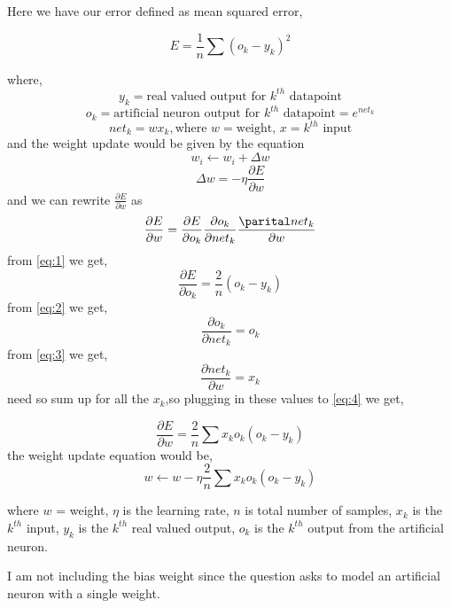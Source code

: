 \documentclass{article}
\begin{document}
Here we have our error defined as mean squared error,

\begin{equation}
\label{eq:1}
    E = \frac{1}{n}\sum (o_k - y_k)^2
\end{equation}

where,
\begin{displaymath}
    y_k = \mbox{real valued output for }k^{th} \mbox{ datapoint}
\end{displaymath}
\begin{equation}
\label{eq:2}
    o_k = \mbox{artificial neuron output for }k^{th} \mbox{ datapoint} = e^{net_k}
\end{equation}
\begin{equation}
\label{eq:3}
    net_k = wx_k, \mbox{where } w = \mbox{weight, } x = k^{th}\mbox{ input}
\end{equation}
%
and the weight update would be given by the equation
\begin{displaymath}
    w_i \leftarrow w_i + \Delta w
\end{displaymath}
\begin{displaymath}
    \Delta w = - \eta \frac{\partial E}{\partial w}
\end{displaymath}
%
and we can rewrite $\frac{\partial E}{\partial w}$ as
\begin{equation}
    \label{eq:4}
    \frac{\partial E}{\partial w} = \frac{\partial E}{\partial o_k} \frac{\partial o_k}{\partial net_k} \frac{\parital net_k}{\partial w}
\end{equation}
%
from \eqref{eq:1} we get,
\begin{equation}
    \label{eq:4}
    \frac{\partial E}{\partial o_k} = \frac{2}{n} (o_k - y_k)
\end{equation}
%
from \eqref{eq:2} we get,
\begin{equation}
    \label{eq:5}
    \frac{\partial o_k}{\partial net_k} = o_k
\end{equation}
%
from \eqref{eq:3} we get,
\begin{equation}
    \label{eq:6}
    \frac{\partial net_k}{\partial w} = x_k
\end{equation}
%
need so sum up for all the $x_k$,so plugging in these values to \eqref{eq:4} we get,

\begin{displaymath}
    \frac{\partial E}{\partial w} = \frac{2}{n} \sum x_k o_k (o_k - y_k)
\end{displaymath}
%
the weight update equation would be,
\begin{displaymath}
    w \leftarrow w - \eta \frac{2}{n} \sum x_k o_k (o_k - y_k)
\end{displaymath}

where $w$ = weight, $\eta$ is the learning rate, $n$ is total number of samples, $x_k$ is the $k^{th}$ input, $y_k$ is the $k^{th}$ real valued output, $o_k$ is the $k^{th}$ output from the artificial neuron.

I am not including the bias weight since the question asks to model an artificial neuron with a single weight.
\end{document}
